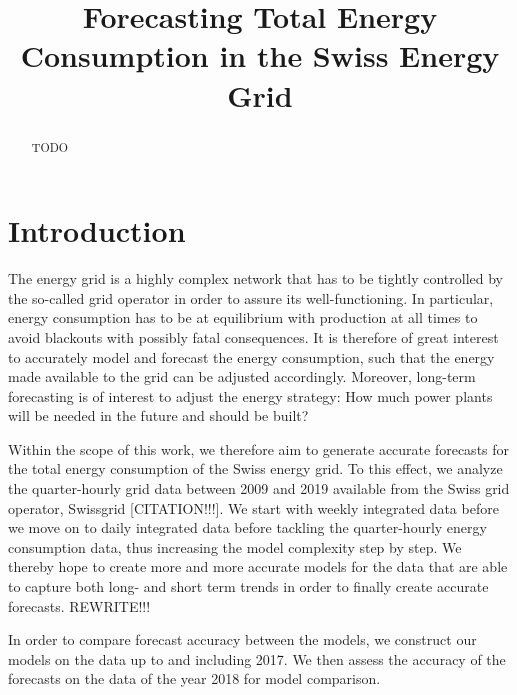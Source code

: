 \documentclass[conference]{IEEEtran}
\begin{document}
\title{Forecasting Total Energy Consumption in the Swiss Energy Grid}

\author{
\and
{}
}


\maketitle

\begin{abstract}
TODO
\end{abstract}


\section{Introduction}
The energy grid is a highly complex network that has to be tightly controlled by the so-called grid operator in order to assure its well-functioning. In particular, energy consumption has to be at equilibrium with production at all times to avoid blackouts with possibly fatal consequences. It is therefore of great interest to accurately model and forecast the energy consumption, such that the energy made available to the grid can be adjusted accordingly. Moreover, long-term forecasting is of interest to adjust the energy strategy: How much power plants will be needed in the future and should be built? 
\par
Within the scope of this work, we therefore aim to generate accurate forecasts for the total energy consumption of the Swiss energy grid. To this effect, we analyze the quarter-hourly grid data between 2009 and 2019 available from the Swiss grid operator, Swissgrid [CITATION!!!]. We start with weekly integrated data before we move on to daily integrated data before tackling the quarter-hourly energy consumption data, thus increasing the model complexity step by step. We thereby hope to create more and more accurate models for the data that are able to capture both long- and short term trends in order to finally create accurate forecasts. REWRITE!!!
\par
In order to compare forecast accuracy between the models, we construct our models on the data up to and including 2017. We then assess the accuracy of the forecasts on the data of the year 2018 for model comparison. 
\par


\end{document}

